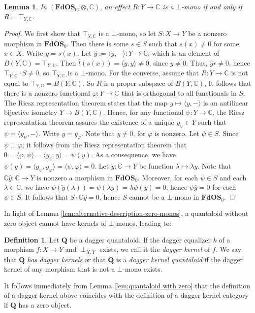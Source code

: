 \documentclass[12pt]{tac}
\newtheorem{lemma}[theorem]{Lemma}
\theoremstyle{definition}
\newtheorem{definition}[theorem]{Definition}
\theoremstyle{remark}
\newcommand{\CC}{\mathbb C}
\newcommand{\<}{\langle}
\renewcommand{\>}{\rangle}
\renewcommand{\:}{\colon}
\begin{document}
\begin{lemma}\label{lem:zero mono effects in FdOS0}
In $(\mathbf{FdOS}_0,\otimes,\CC)$, an effect $R:Y\to \mathbb C$ is a $\bot$-mono if and only if $R=\top_{Y,\mathbb C}$.
        \end{lemma}
\begin{proof}
        We first show that $\top_{Y,\mathbb C}$ is a $\bot$-mono, so let $S:X\to Y$ be a nonzero morphism in $\mathbf{FdOS}_0$. Then there is some $s\in S$ such that $s(x)\neq 0$ for some $x\in X$. Write $y=s(x)$. Let $\hat y:=\langle y,-\rangle:Y\to\CC$, which is an element of $B(Y,\CC)=\top_{Y,\CC}$. Then $\hat t(s(x))=\langle y,y\rangle\neq 0$, since $y\neq 0$. Thus, $\hat yr\neq 0$, hence $\top_{Y,\CC}\cdot S\neq 0$, so $\top_{Y,\CC}$ is a $\bot$-mono.  For the converse, assume that $R:Y\to\CC$ is not equal to $\top_{Y,\CC}=B(Y,\CC)$. So $R$ is a proper subspace of $B(Y,\CC)$, It follows that there is a nonzero functional $\varphi:Y\to\mathbb C$ that is orthogonal to all functionals in $S$. The Riesz representation theorem states that the map $y\mapsto\langle y,-\rangle$ is an antilinear bijective isometry $Y\to B(Y,\CC)$. Hence, for any functional $\psi:Y\to\CC$, the Riesz representation theorem assures the existence of a unique $y_\psi\in Y$ such that $\psi=\langle y_\psi,-\rangle$.
Write $y=y_\varphi$. Note that $y\neq 0$, for $\varphi$ is nonzero. Let $\psi\in S$.
Since $\psi\perp\varphi$, it follows from the Riesz representation theorem that
$0=\langle\varphi,\psi\rangle=\langle y_\psi,y\rangle=\psi(y)$. As a consequence, we
have $\psi(y)=\langle y_\psi,y_\varphi\rangle=\langle \psi,\varphi\rangle=0$.  Let
$\check{y}:\CC\to Y$ be function $\lambda\mapsto \lambda y$. Note that $\CC\hat
y:\CC\to Y$ is nonzero a morphism in $\mathbf{FdOS}_0$. Moreover, for each $\psi\in
S$ and each $\lambda\in\CC$, we have $\psi(\check y(\lambda))=\psi(\lambda
y)=\lambda\psi(y)=0$, hence $\psi\hat y=0$ for each $\psi\in S$. It follows that
$S\cdot\CC\hat y=0$, hence $S$ cannot be a $\bot$-mono in $\mathbf{FdOS}_0$. 
\end{proof}




In light of Lemma \ref{lem:alternative-description-zero-monos}, a quantaloid without zero object cannot have kernels of $\bot$-monos, leading to:

\begin{definition}
    Let $\mathbf Q$ be a dagger quantaloid. If the dagger equalizer $k$ of a morphism $f:X\to Y$ and $\perp_{X,Y}$ exists, we call it the \emph{dagger kernel} of $f$. We say that $\mathbf Q$ \emph{has dagger kernels} or that $\mathbf Q$ is a \emph{dagger kernel quantaloid} if the dagger kernel of any morphism that is not a $\bot$-mono exists.
\end{definition}
It follows immediately from Lemma \ref{lem:quantaloid with zero} that the definition of a dagger kernel above coincides with the definition of a dagger kernel category if $\mathbf Q$ has a zero object.
\end{document}
